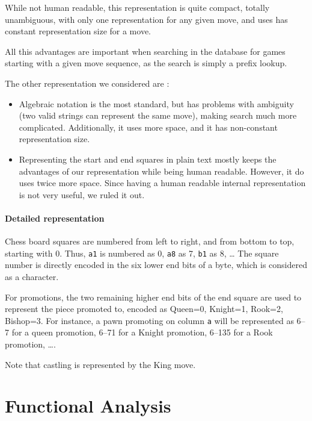 \documentclass{article}
\begin{document}
While not human readable, this representation is quite compact, totally unambiguous,
with only one representation for any given move, and uses has constant representation
size for a move.

All this advantages are important when searching in the database for games starting
with a given move sequence, as the search is simply a prefix lookup.

The other representation we considered are :
\begin{itemize}
\item Algebraic notation is the most standard, but has problems with ambiguity
(two valid strings can represent the same move), making search much more complicated.
Additionally, it uses more space, and it has non-constant representation size.

\item Representing the start and end squares in plain text mostly keeps the advantages
of our representation while being human readable. However, it do uses twice more space.
Since having a human readable internal representation is not very useful,
we ruled it out.
\end{itemize}


\paragraph{Detailed representation}
Chess board squares are numbered from left to right, and from bottom to top,
starting with 0. Thus, \verb|a1| is numbered as 0, \verb|a8| as 7, \verb|b1| as 8, \dots
The square number is directly encoded in the six lower end bits of a byte, which is considered as a character.

For promotions, the two remaining higher end bits of the end square are used to represent the piece promoted to,
encoded as Queen=0, Knight=1, Rook=2, Bishop=3.
For instance, a pawn promoting on column \verb|a| will be represented as 6--7 for a queen promotion,
6--71 for a Knight promotion, 6--135 for a Rook promotion, \dots.

Note that castling is represented by the King move.

\section{Functional Analysis}
\end{document}
